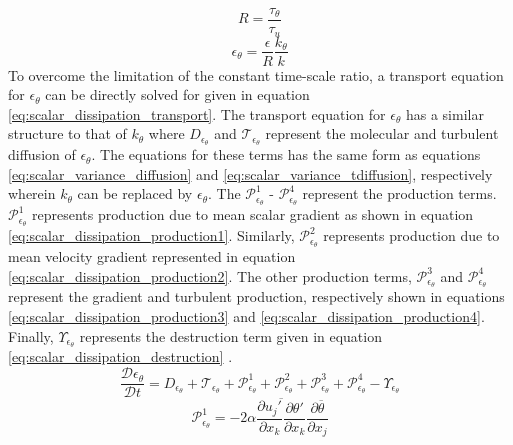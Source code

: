 \begin{equation}
\label{eq:scalar_timescale_ratio}
R = \frac{\tau_{\theta}}{\tau_{u}}
\end{equation}
\begin{equation}
\label{eq:scalar_dissipation_algebraic}
\epsilon_{\theta} = \frac{\epsilon}{R}\frac{k_{\theta}}{k} 
\end{equation}
To overcome the limitation of the constant time-scale ratio, a transport equation for $\epsilon_{\theta}$ can be directly solved for given in equation \ref{eq:scalar_dissipation_transport}. The transport equation for $\epsilon_{\theta}$ has a similar structure to that of $k_{\theta}$ where $D_{\epsilon_{\theta}}$ and $\mathcal{T}_{\epsilon_{\theta}}$ represent the molecular and turbulent diffusion of $\epsilon_{\theta}$. The equations for these terms has the same form as equations \ref{eq:scalar_variance_diffusion} and \ref{eq:scalar_variance_tdiffusion}, respectively wherein $k_{\theta}$ can be replaced by $\epsilon_{\theta}$. The $\mathcal{P}_{\epsilon_{\theta}}^{1}$ - $\mathcal{P}_{\epsilon_{\theta}}^{4}$ represent the production terms. $\mathcal{P}_{\epsilon_{\theta}}^{1}$ represents production due to mean scalar gradient as shown in equation \ref{eq:scalar_dissipation_production1}. Similarly, $\mathcal{P}_{\epsilon_{\theta}}^{2}$ represents production due to mean velocity gradient represented in equation \ref{eq:scalar_dissipation_production2}. The other production terms, $\mathcal{P}_{\epsilon_{\theta}}^{3}$ and $\mathcal{P}_{\epsilon_{\theta}}^{4}$ represent the gradient and turbulent production, respectively shown in equations \ref{eq:scalar_dissipation_production3} and \ref{eq:scalar_dissipation_production4}. Finally, $\Upsilon_{\epsilon_{\theta}}$ represents the destruction term given in equation \ref{eq:scalar_dissipation_destruction} \cite{Nagano2001}. 
\begin{equation}
\label{eq:scalar_dissipation_transport}
\frac{\mathcal{D} \epsilon_{\theta}}{\mathcal{D} t} = D_{\epsilon_{\theta}} + \mathcal{T}_{\epsilon_{\theta}} + \mathcal{P}_{\epsilon_{\theta}}^{1} + \mathcal{P}_{\epsilon_{\theta}}^{2} + \mathcal{P}_{\epsilon_{\theta}}^{3} + \mathcal{P}_{\epsilon_{\theta}}^{4} - \Upsilon_{\epsilon_{\theta}}
\end{equation}
\begin{equation}
\label{eq:scalar_dissipation_production1}
\mathcal{P}_{\epsilon_{\theta}}^{1} = -2\alpha\overline{\frac{\partial u_{j}'}{\partial x_{k}}\frac{\partial \theta'}{\partial x_{k}}}\frac{\partial \overline{\theta}}{\partial x_{j}}
\end{equation}
